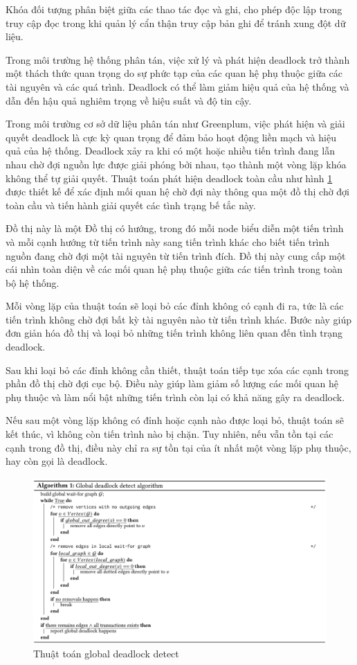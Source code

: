 \documentclass[14pt]{article}
\begin{document}
Khóa đối tượng phân biệt giữa các thao tác đọc và ghi, cho phép độc lập trong truy cập đọc trong khi quản lý cẩn thận truy cập bản ghi để tránh xung đột dữ liệu.

Trong môi trường hệ thống phân tán, việc xử lý và phát hiện deadlock trở thành một thách thức quan trọng do sự phức tạp của các quan hệ phụ thuộc giữa các tài nguyên và các quá trình. Deadlock có thể làm giảm hiệu quả của hệ thống và dẫn đến hậu quả nghiêm trọng về hiệu suất và độ tin cậy.



Trong môi trường cơ sở dữ liệu phân tán như Greenplum, việc phát hiện và giải quyết deadlock là cực kỳ quan trọng để đảm bảo hoạt động liền mạch và hiệu quả của hệ thống. Deadlock xảy ra khi có một hoặc nhiều tiến trình đang lẫn nhau chờ đợi nguồn lực được giải phóng bởi nhau, tạo thành một vòng lặp khóa không thể tự giải quyết. Thuật toán phát hiện deadlock toàn cầu như hình \ref{fig:algorithmGreenplum}  được thiết kế để xác định mối quan hệ chờ đợi này thông qua một đồ thị chờ đợi toàn cầu và tiến hành giải quyết các tình trạng bế tắc này.

Đồ thị này là một Đồ thị có hướng, trong đó mỗi node biểu diễn một tiến trình và mỗi cạnh hướng từ tiến trình này sang tiến trình khác cho biết tiến trình nguồn đang chờ đợi một tài nguyên từ tiến trình đích. Đồ thị này cung cấp một cái nhìn toàn diện về các mối quan hệ phụ thuộc giữa các tiến trình trong toàn bộ hệ thống.

Mỗi vòng lặp của thuật toán sẽ loại bỏ các đỉnh không có cạnh đi ra, tức là các tiến trình không chờ đợi bất kỳ tài nguyên nào từ tiến trình khác. Bước này giúp đơn giản hóa đồ thị và loại bỏ những tiến trình không liên quan đến tình trạng deadlock.

Sau khi loại bỏ các đỉnh không cần thiết, thuật toán tiếp tục xóa các cạnh trong phần đồ thị chờ đợi cục bộ. Điều này giúp làm giảm số lượng các mối quan hệ phụ thuộc và làm nổi bật những tiến trình còn lại có khả năng gây ra deadlock.

Nếu sau một vòng lặp không có đỉnh hoặc cạnh nào được loại bỏ, thuật toán sẽ kết thúc, vì không còn tiến trình nào bị chặn. Tuy nhiên, nếu vẫn tồn tại các cạnh trong đồ thị, điều này chỉ ra sự tồn tại của ít nhất một vòng lặp phụ thuộc, hay còn gọi là deadlock.



\begin{figure}
    \centering
    \includegraphics[width=0.8\linewidth]{images/algorithmGreenplum.png}
    \caption{Thuật toán global deadlock detect \cite{lyu2021greenplum}}
    \label{fig:algorithmGreenplum}
\end{figure}
\end{document}
